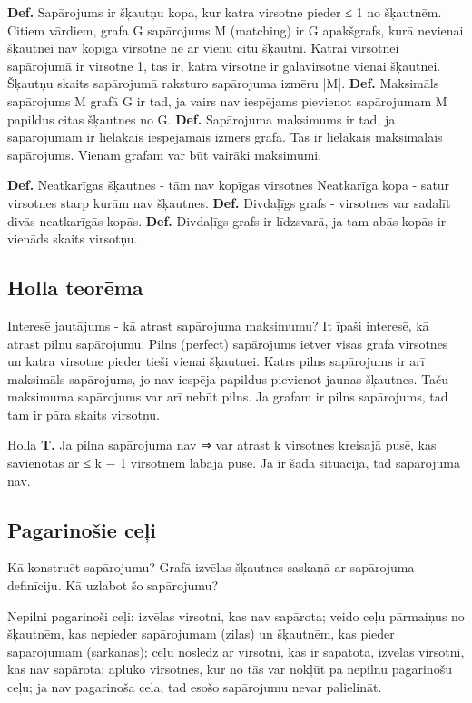 \documentclass{article}
\begin{document}
\textbf{Def.} Sapārojums ir šķautņu kopa, kur katra virsotne pieder ≤ 1 no šķautnēm. Citiem vārdiem, grafa G sapārojums M (matching) ir G apakšgrafs, kurā nevienai šķautnei nav kopīga virsotne ne ar vienu citu šķautni. Katrai virsotnei sapārojumā ir virsotne 1, tas ir, katra virsotne ir galavirsotne vienai šķautnei. Šķautņu skaits sapārojumā raksturo sapārojuma izmēru |M|.
\textbf{Def.} Maksimāls sapārojums M grafā G ir tad, ja vairs nav iespējams pievienot sapārojumam M papildus citas šķautnes no G.
\textbf{Def.} Sapārojuma maksimums ir tad, ja sapārojumam ir lielākais iespējamais izmērs grafā. Tas ir lielākais maksimālais sapārojums.  Vienam grafam var būt vairāki maksimumi.

\textbf{Def.} Neatkarīgas šķautnes - tām nav kopīgas virsotnes Neatkarīga kopa - satur virsotnes starp kurām nav šķautnes.
\textbf{Def.} Divdaļīgs grafs - virsotnes var sadalīt divās neatkarīgās kopās.
\textbf{Def.} Divdaļīgs grafs ir līdzsvarā, ja tam abās kopās ir vienāds skaits virsotņu.

\subsection{Holla teorēma}

Interesē jautājums - kā atrast sapārojuma maksimumu?  It īpaši interesē, kā atrast pilnu sapārojumu.  Pilns (perfect) sapārojums ietver visas grafa virsotnes un katra virsotne pieder tieši vienai šķautnei.  Katrs pilns sapārojums ir arī maksimāls sapārojums, jo nav iespēja papildus pievienot jaunas šķautnes. Taču maksimuma sapārojums var arī nebūt pilns.  Ja grafam ir pilns sapārojums, tad tam ir pāra skaits virsotņu.


Holla \textbf{T. }Ja pilna sapārojuma nav ⇒ var atrast k virsotnes kreisajā pusē, kas savienotas ar ≤ k − 1 virsotnēm labajā pusē.  Ja ir šāda situācija, tad sapārojuma nav.

\subsection{Pagarinošie ceļi}

Kā konstruēt sapārojumu?  Grafā izvēlas šķautnes saskaņā ar sapārojuma definīciju.  Kā uzlabot šo sapārojumu?


Nepilni pagarinoši ceļi: izvēlas virsotni, kas nav sapārota; veido ceļu pārmaiņus no šķautnēm, kas nepieder sapārojumam (zilas) un šķautnēm, kas pieder sapārojumam (sarkanas); ceļu noslēdz ar virsotni, kas ir sapātota, izvēlas virsotni, kas nav sapārota; apluko virsotnes, kur no tās var nokļūt pa nepilnu pagarinošu ceļu; ja nav pagarinoša ceļa, tad esošo sapārojumu nevar palielināt.
\end{document}
